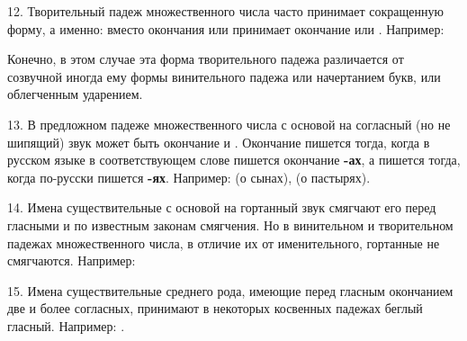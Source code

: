 \documentclass[11pt,a4paper,oneside]{memoir}
\begin{document}
    \bigskip{}

    12. Творительный падеж множественного числа часто принимает сокращенную форму, а именно: вместо окончания {} или {} принимает окончание {} или {}. Например:
    
    \bigskip{}

    Конечно, в этом случае эта форма творительного падежа различается от созвучной иногда ему формы винительного падежа или начертанием букв, или облегченным ударением.
    
    13. В предложном падеже множественного числа с основой на согласный (но не шипящий) звук может быть окончание {} и {}. Окончание {} пишется тогда, когда в русском языке в соответствующем слове пишется окончание \textbf{-ах}, а {} пишется тогда, когда по-русски пишется \textbf{-ях}. Например: {} (о сынах), {} (о пастырях).
    
    14. Имена существительные с основой на гортанный звук смягчают его перед гласными {\slv{}} и {\slv{}} по известным законам смягчения. Но в винительном и творительном падежах множественного числа, в отличие их от именительного, гортанные не смягчаются. Например:
    
    \medskip{}

    15. Имена существительные среднего рода, имеющие перед гласным окончанием две и более согласных, принимают в некоторых косвенных падежах беглый гласный. Например: {}.
    
\end{document}
